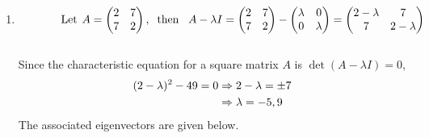\documentclass[12pt]{amsart}
\begin{document}
\begin{enumerate}
\begin{enumerate}
			\item
			\begin{align}
				\hspace{1.3cm} \text{Let} \hspace{0.15cm}  A=
				\begin{pmatrix}
					2 &7 \\
					7 &2
				\end{pmatrix}, \hspace{0.2cm} 
				\text{then} \hspace{0.3cm} A-\lambda I=
				\begin{pmatrix}
					2 &7 \\
					7 &2
				\end{pmatrix}-
				\begin{pmatrix}
					\lambda &0 \\
					0 &\lambda
				\end{pmatrix}=
				\begin{pmatrix}
					2-\lambda &7 \\
					7 &2-\lambda
				\end{pmatrix} \notag
			\end{align} \\
			Since the characteristic equation for a square matrix $A$ is $\det(A-\lambda I)=0$, 
			\begin{align}
				(2-\lambda)^2-49=0 &\Rightarrow 2-\lambda=\pm7 \notag \\
				&\Rightarrow \lambda=-5,9 \notag
			\end{align}
			The associated eigenvectors are given below. \\
			

\end{enumerate}
\end{enumerate}
\end{document}
